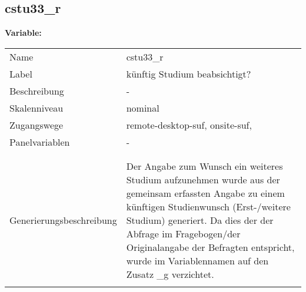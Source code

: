 	
	
	\subsection{cstu33\_r}
	\label{subSection:cstu33_r}

	\noindent\textbf{Variable:}\\
		\begin{tabular}{lL{11.3cm}}
			\label{tableVariable:cstu33_r}
			Name & cstu33\_r \\
			Label & künftig Studium beabsichtigt? \\
			Beschreibung & - \\
			Skalenniveau & nominal \\
			Zugangswege &
				remote-desktop-suf,
				onsite-suf,
 \\
			Panelvariablen & -
			 \\
			 \\
 \\
					Generierungsbeschreibung & Der Angabe zum Wunsch ein weiteres Studium aufzunehmen wurde aus der gemeinsam erfassten Angabe zu einem künftigen Studienwunsch (Erst-/weitere Studium) generiert. Da dies der der Abfrage im Fragebogen/der Originalangabe der Befragten entspricht, wurde im Variablennamen auf den Zusatz \_g verzichtet.
				 \\	
			 \\
		\end{tabular}






